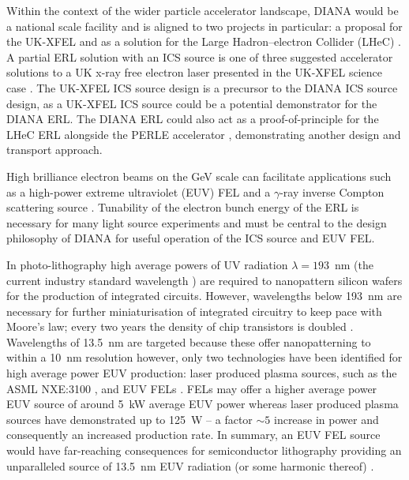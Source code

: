 \documentclass[../main.tex]{subfiles}
\begin{document}
Within the context of the wider particle accelerator landscape, DIANA would be a national scale facility and is aligned to two projects in particular: a proposal for the UK-XFEL \cite{burnett2020uk} and as a solution for the Large Hadron--electron Collider (LHeC) \cite{valloni2013strawman,bruning2019exploring,holzer2021accelerator,agostini2021large}. A partial ERL solution with an ICS source is one of three suggested accelerator solutions to a UK x-ray free electron laser presented in the UK-XFEL science case \cite{burnett2020uk}. The UK-XFEL ICS source design is a precursor to the DIANA ICS source design, as a UK-XFEL ICS source could be a potential demonstrator for the DIANA ERL. The DIANA ERL could also act as a proof-of-principle for the LHeC ERL alongside the PERLE accelerator \cite{angal2018perle}, demonstrating another design and transport approach.

High brilliance electron beams on the \si{\giga\electronvolt} scale can facilitate applications such as a high-power extreme ultraviolet (EUV) FEL \cite{akkermans2017compact} and a $\gamma$-ray inverse Compton scattering source \cite{hajima2008proposal,hajima2014application}. Tunability of the electron bunch energy of the ERL is necessary for many light source experiments and must be central to the design philosophy of DIANA for useful operation of the ICS source and EUV FEL. 

In photo-lithography high average powers of UV radiation $\lambda=193$~\si{\nano\meter} (the current industry standard wavelength \cite{socol2011compact}) are required to nanopattern silicon wafers for the production of integrated circuits. However, wavelengths below 193~\si{\nano\meter} are necessary for further miniaturisation of integrated circuitry to keep pace with Moore's law; every two
years the density of chip transistors is doubled \cite{moore1975international}. Wavelengths of 13.5~\si{\nano\meter} are targeted because these offer nanopatterning to within a 10~\si{\nano\meter} resolution \cite{wagner2010lithography} however, only two technologies have been identified for high average power EUV production: laser produced plasma sources, such as the ASML NXE:3100 \cite{wagner2011euv,socol2011compact}, and EUV FELs \cite{socol2011compact,akkermans2017compact}. FELs may offer a higher average power EUV source of around 5~\si{\kilo\watt} average EUV power \cite{akkermans2017compact} whereas laser produced plasma sources have demonstrated up to 125~\si{\watt} \cite{socol2011compact} -- a factor $\sim5$ increase in power and consequently an increased production rate. In summary, an EUV FEL source would have far-reaching consequences for semiconductor lithography providing an unparalleled source of 13.5~\si{\nano\meter} EUV radiation (or some harmonic thereof) \cite{socol2011compact}.  
\end{document}
